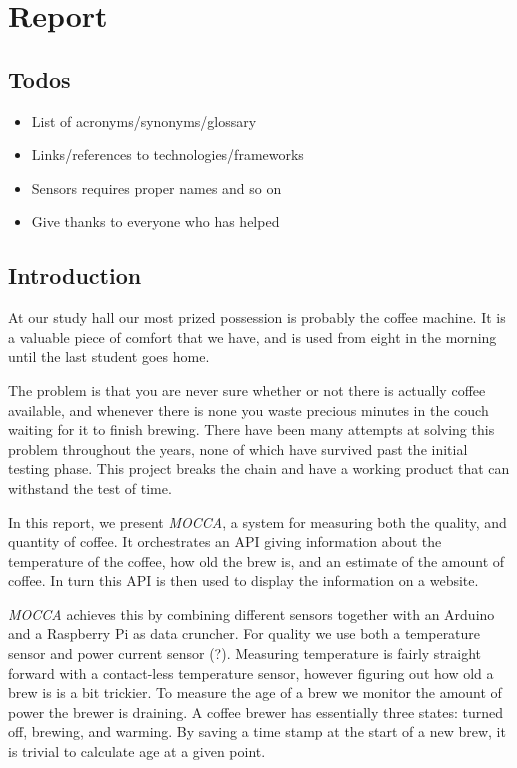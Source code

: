 \documentclass[12pt,a4paper,oneside,article]{memoir}
\numberwithin{equation}{chapter}
\begin{document}
\clearpage

\chapter{Report}
\section*{Todos}
\begin{itemize}
\item List of acronyms/synonyms/glossary
\item Links/references to technologies/frameworks
\item Sensors requires proper names and so on
\item Give thanks to everyone who has helped
\end{itemize}

\section{Introduction}\label{sec:introduction}
At our study hall our most prized possession is probably the coffee 
machine. It is a valuable piece of comfort that we have, and is used from eight 
in the morning until the last student goes home.

The problem is that you are never sure whether or not there is actually coffee
available, and whenever there is none you waste precious minutes in the couch
waiting for it to finish brewing. There have been many attempts at solving this
problem throughout the years, none of which have survived past the initial
testing phase. This project breaks the chain and have a working product that can
withstand the test of time.

In this report, we present \textit{MOCCA}, a system for measuring both the 
quality, and quantity of coffee. It orchestrates an API giving information 
about the temperature of the coffee, how old the brew is, and an estimate of 
the amount of coffee. In turn this API is then used to display the information 
on a website.

\textit{MOCCA} achieves this by combining different sensors together with an 
Arduino and a Raspberry Pi as data cruncher. For quality we use both a 
temperature sensor and power current sensor (?). Measuring temperature is fairly 
straight forward with a contact-less temperature sensor, however figuring out 
how old a brew is is a bit trickier. 
To measure the age of a brew we monitor the amount of power the brewer is 
draining. A coffee brewer has essentially three states: turned off, brewing, and 
warming. By saving a time stamp at the start of a new brew, it is trivial to 
calculate age at a given point. 
\end{document}
